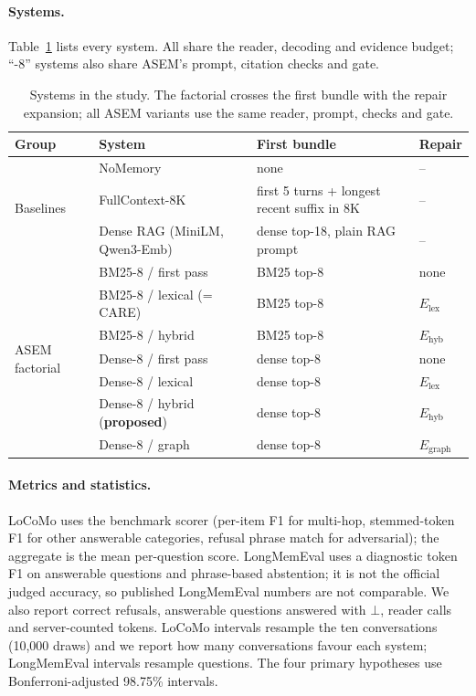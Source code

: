 \documentclass[10pt]{article}
\theoremstyle{plain}
\theoremstyle{definition}
\newcommand{\asem}{\textsc{ASEM}}
\newcommand{\care}{\textsc{CARE}}
\begin{document}
\paragraph{Systems.} Table~\ref{tab:systems} lists every system. All share the reader, decoding and
evidence budget; ``-8'' systems also share \asem{}'s prompt, citation checks and gate.

\begin{table}[t]
\centering
\caption{Systems in the study. The factorial crosses the first bundle with the repair expansion; all
\asem{} variants use the same reader, prompt, checks and gate.}
\label{tab:systems}
\small
\begin{tabular}{llll}
\toprule
Group & System & First bundle & Repair \\
\midrule
\multirow{3}{*}{Baselines} & NoMemory & none & -- \\
 & FullContext-8K & first 5 turns + longest recent suffix in 8K & -- \\
 & Dense RAG (MiniLM, Qwen3-Emb) & dense top-18, plain RAG prompt & -- \\
\midrule
\multirow{7}{*}{\asem{} factorial} & BM25-8 / first pass & BM25 top-8 & none \\
 & BM25-8 / lexical (= \care{}) & BM25 top-8 & $E_{\mathrm{lex}}$ \\
 & BM25-8 / hybrid & BM25 top-8 & $E_{\mathrm{hyb}}$ \\
 & Dense-8 / first pass & dense top-8 & none \\
 & Dense-8 / lexical & dense top-8 & $E_{\mathrm{lex}}$ \\
 & Dense-8 / hybrid (\textbf{proposed}) & dense top-8 & $E_{\mathrm{hyb}}$ \\
 & Dense-8 / graph & dense top-8 & $E_{\mathrm{graph}}$ \\
\bottomrule
\end{tabular}
\end{table}

\paragraph{Metrics and statistics.} LoCoMo uses the benchmark scorer (per-item F1 for multi-hop,
stemmed-token F1 for other answerable categories, refusal phrase match for adversarial); the aggregate is
the mean per-question score. LongMemEval uses a diagnostic token F1 on answerable questions and
phrase-based abstention; it is not the official judged accuracy, so published LongMemEval numbers are not
comparable. We also report correct refusals, answerable questions answered with $\bot$, reader calls and
server-counted tokens. LoCoMo intervals resample the ten conversations (10,000 draws) and we report how
many conversations favour each system; LongMemEval intervals resample questions. The four primary
hypotheses use Bonferroni-adjusted 98.75\% intervals.
\end{document}
